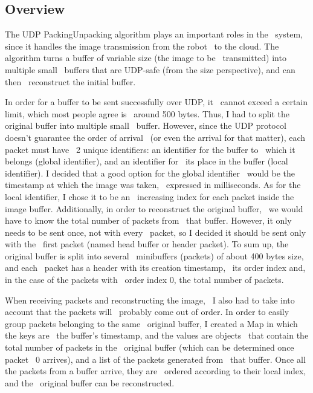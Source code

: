 \subsection{Overview}
\label{subsec:udp-pack-overview}

The UDP Packing\-Unpacking algorithm plays an important roles in the \
system, since it handles the image transmission from the robot \
to the cloud.
The algorithm turns a buffer of variable size (the image to be \
transmitted) into multiple small \
buffers that are UDP-safe (from the size perspective), and can then \
reconstruct the initial buffer.

In order for a buffer to be sent successfully over UDP, it \
cannot exceed a certain limit, which most people agree is \
around 500 bytes.
Thus, I had to split the original buffer into multiple small \
buffer.
However, since the UDP protocol doesn't guarantee the order of arrival \
(or even the arrival for that matter), each packet must have \
2 unique identifiers: an identifier for the buffer to \
which it belongs (global identifier), and an identifier for \
its place in the buffer (local identifier).
I decided that a good option for the global identifier \
would be the timestamp at which the image was taken, \
expressed in milliseconds.
As for the local identifier, I chose it to be an \
increasing index for each packet inside the image buffer.
Additionally, in order to reconstruct the original buffer, \
we would have to know the total number of packets from \
that buffer.
However, it only needs to be sent once, not with every \
packet, so I decided it should be sent only with the \
first packet (named head buffer or header packet).
To sum up, the original buffer is split into several \
mini\-buffers (packets) of about 400 bytes size, and each \
packet has a header with its creation timestamp, \
its order index and, in the case of the packets with \
order index 0, the total number of packets.

When receiving packets and reconstructing the image, \
I also had to take into account that the packets will \
probably come out of order.
In order to easily group packets belonging to the same \
original buffer, I created a Map in which the keys are \
the buffer's timestamp, and the values are objects \
that contain the total number of packets in the \
original buffer (which can be determined once packet \
0 arrives), and a list of the packets generated from \
that buffer.
Once all the packets from a buffer arrive, they are \
ordered according to their local index, and the \
original buffer can be reconstructed.


